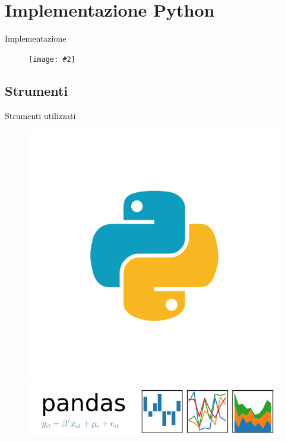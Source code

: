 \documentclass[xcolor={dvipsnames}]{beamer}
\newcommand{\figcen}[2]{
	\begin{figure}
		\begin{center}
			\texttt{[image: \#2]}
		\end{center}
	\end{figure}
}
\begin{document}
\section{Implementazione Python}

	\begin{frame}{Implementazione}
		\figcen{.9\textwidth}{coding}
	\end{frame}

	\subsection{Strumenti}

		\begin{frame}{Strumenti utilizzati}
			\begin{figure}[htbp]
				\centering
				\begin{minipage}[c]{.35\textwidth}
					\centering\setlength{\captionmargin}{0pt}%
					\includegraphics[width=.9\textwidth]{python}
				\end{minipage}%
				\hspace{10mm}%
				\begin{minipage}[c]{.55\textwidth}
					\centering\setlength{\captionmargin}{0pt}%
					\includegraphics[width=\textwidth]{pandas}

\end{minipage}
\end{figure}
\end{frame}
\end{document}
